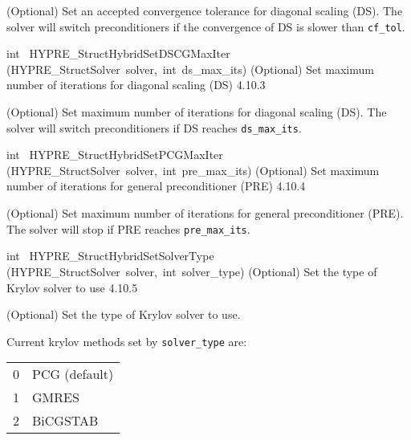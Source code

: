 \documentclass{article}
\begin{document}
\begin{cxxentry}
\begin{cxxentry}
\begin{cxxfunction}
\begin{cxxdoc}
(Optional) Set an accepted convergence tolerance for diagonal scaling (DS).
The solver will switch preconditioners if the convergence of DS is slower
than {\tt cf\_tol}.
\end{cxxdoc}
\end{cxxfunction}
\begin{cxxfunction}
{int\ }
        {HYPRE\_StructHybridSetDSCGMaxIter}
        {(HYPRE\_StructSolver\ solver,\ int\ ds\_max\_its)}
        {
(Optional) Set maximum number of iterations for diagonal scaling (DS)}
        {4.10.3}
\begin{cxxdoc}

(Optional) Set maximum number of iterations for diagonal scaling (DS).  The
solver will switch preconditioners if DS reaches {\tt ds\_max\_its}.
\end{cxxdoc}
\end{cxxfunction}
\begin{cxxfunction}
{int\ }
        {HYPRE\_StructHybridSetPCGMaxIter}
        {(HYPRE\_StructSolver\ solver,\ int\ pre\_max\_its)}
        {
(Optional) Set maximum number of iterations for general preconditioner (PRE)}
        {4.10.4}
\begin{cxxdoc}

(Optional) Set maximum number of iterations for general preconditioner (PRE).
The solver will stop if PRE reaches {\tt pre\_max\_its}.
\end{cxxdoc}
\end{cxxfunction}
\begin{cxxfunction}
{int\ }
        {HYPRE\_StructHybridSetSolverType}
        {(HYPRE\_StructSolver\ solver,\ int\ solver\_type)}
        {
(Optional) Set the type of Krylov solver to use}
        {4.10.5}
\begin{cxxdoc}

(Optional) Set the type of Krylov solver to use.

Current krylov methods set by {\tt solver\_type} are:

\begin{tabular}{l@{ -- }l}
0 & PCG (default) \\
1 & GMRES \\
2 & BiCGSTAB \\
\end{tabular}
\end{cxxdoc}
\end{cxxfunction}
\end{cxxentry}
\end{cxxentry}
\end{document}
